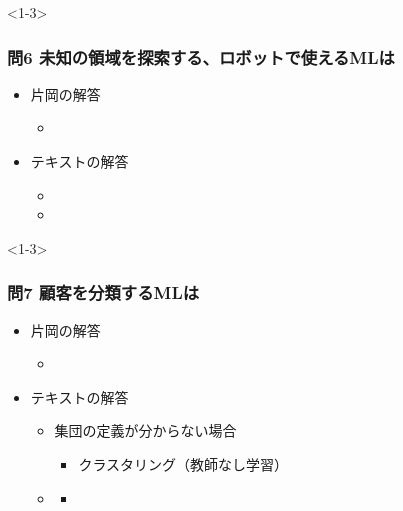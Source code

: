 \documentclass[aspectratio=169, dvipdfmx, 14pt, xcolor={svgnames,dvipsnames}]{beamer}
\def\tightlist{\itemsep1pt\parskip0pt\parsep0pt}
\begin{document}

\begin{frame}<1-3>
  \frametitle{問6 未知の領域を探索する、ロボットで使えるMLは}
  \begin{itemize}
    \tightlist
    \item
          片岡の解答

          \begin{itemize}
            \tightlist
            \item
          \end{itemize}
    \item
          テキストの解答

          \begin{itemize}
            \tightlist
            \item
            \item
          \end{itemize}
  \end{itemize}
\end{frame}


\begin{frame}<1-3>
  \frametitle{問7 顧客を分類するMLは}
  \begin{itemize}
    \tightlist
    \item
          片岡の解答

          \begin{itemize}
            \tightlist
            \item
          \end{itemize}
    \item
          テキストの解答

          \begin{itemize}
            \tightlist
            \item
                  集団の定義が分からない場合

                  \begin{itemize}
                    \tightlist
                    \item
                          クラスタリング（教師なし学習）
                  \end{itemize}
            \item

                  \begin{itemize}
                    \tightlist
                    \item
                  \end{itemize}
          \end{itemize}
  \end{itemize}
\end{frame}
\end{document}
